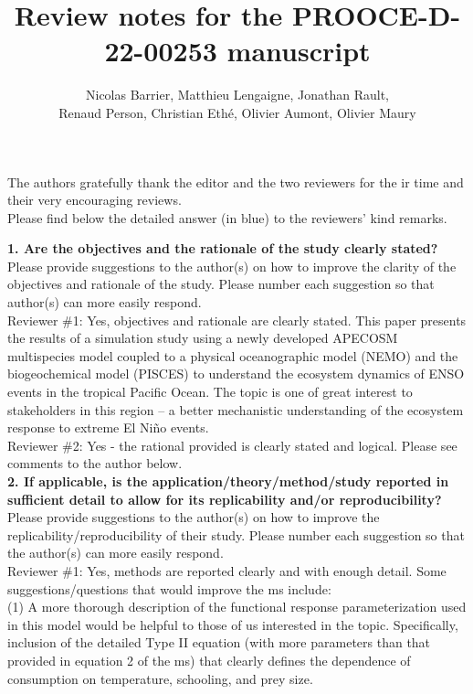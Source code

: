 \documentclass[12pt]{article}
\author{Nicolas Barrier, Matthieu Lengaigne, Jonathan Rault,\\Renaud Person, Christian Eth\'{e}, Olivier Aumont, Olivier Maury}
\title{Review notes for the PROOCE-D-22-00253 manuscript}
\begin{document}
\onehalfspacing

\maketitle

The authors gratefully thank the editor and the two reviewers for the	ir time and their very encouraging reviews. \\

Please find below the detailed answer (in blue) to the reviewers' kind remarks.

\textbf{1. Are the objectives and the rationale of the study clearly stated?} \\

Please provide suggestions to the author(s) on how to improve the clarity of the objectives and rationale of the study. Please number each suggestion so that author(s) can more easily respond.\\	

Reviewer \#1: Yes, objectives and rationale are clearly stated. This paper presents the results of a simulation study using a newly developed APECOSM multispecies model coupled to a physical oceanographic model (NEMO) and the biogeochemical model (PISCES) to understand the ecosystem dynamics of ENSO events in the tropical Pacific Ocean. The topic is one of great interest to stakeholders in this region – a better mechanistic understanding of the ecosystem response to extreme El Niño events. \\

Reviewer \#2: Yes - the rational provided is clearly stated and logical. Please see comments to the author below.\\

\textbf{2. If applicable, is the application/theory/method/study reported in sufficient detail to allow for its replicability and/or reproducibility?} \\ 

Please provide suggestions to the author(s) on how to improve the replicability/reproducibility of their study. Please number each suggestion so that the author(s) can more easily respond. \\

Reviewer \#1: Yes, methods are reported clearly and with enough detail. Some suggestions/questions that would improve the ms include: \\

(1) A more thorough description of the functional response parameterization used in this model would be helpful to those of us interested in the topic. Specifically, inclusion of the detailed Type II equation (with more parameters than that provided in equation 2 of the ms) that clearly defines the dependence of consumption on temperature, schooling, and prey size. \\
\end{document}
